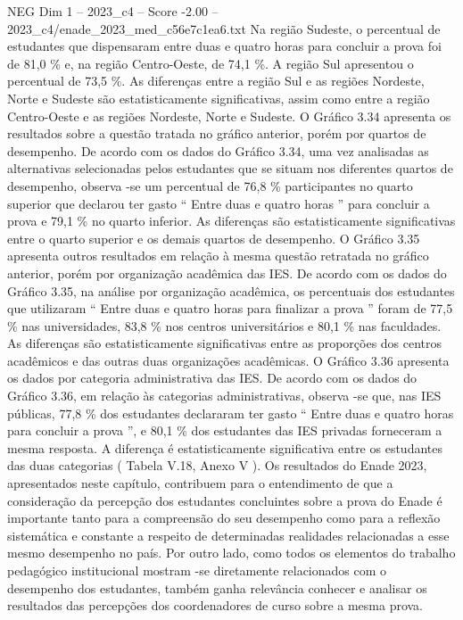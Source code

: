 \begin{textsample}{NEG Dim 1 – 2023\_c4 – Score -2.00 – 2023\_c4/enade\_2023\_med\_c56e7c1ea6.txt}
Na região Sudeste, o percentual de estudantes que dispensaram entre duas e quatro horas para concluir a prova foi de 81,0 \% e, na região Centro-Oeste, de 74,1 \%.
A região Sul apresentou o percentual de 73,5 \%.
As diferenças entre a região Sul e as regiões Nordeste, Norte e Sudeste são estatisticamente significativas, assim como entre a região Centro-Oeste e as regiões Nordeste, Norte e Sudeste.
O Gráfico 3.34 apresenta os resultados sobre a questão tratada no gráfico anterior, porém por quartos de desempenho.
De acordo com os dados do Gráfico 3.34, uma vez analisadas as alternativas selecionadas pelos estudantes que se situam nos diferentes quartos de desempenho, observa -se um percentual de 76,8 \% participantes no quarto superior que declarou ter gasto “ Entre duas e quatro horas ” para concluir a prova e 79,1 \% no quarto inferior.
As diferenças são estatisticamente significativas entre o quarto superior e os demais quartos de desempenho.
O Gráfico 3.35 apresenta outros resultados em relação à mesma questão retratada no gráfico anterior, porém por organização acadêmica das IES.
De acordo com os dados do Gráfico 3.35, na análise por organização acadêmica, os percentuais dos estudantes que utilizaram “ Entre duas e quatro horas para finalizar a prova ” foram de 77,5 \% nas universidades, 83,8 \% nos centros universitários e 80,1 \% nas faculdades.
As diferenças são estatisticamente significativas entre as proporções dos centros acadêmicos e das outras duas organizações acadêmicas.
O Gráfico 3.36 apresenta os dados por categoria administrativa das IES.
De acordo com os dados do Gráfico 3.36, em relação às categorias administrativas, observa -se que, nas IES públicas, 77,8 \% dos estudantes declararam ter gasto “ Entre duas e quatro horas para concluir a prova ”, e 80,1 \% dos estudantes das IES privadas forneceram a mesma resposta.
A diferença é estatisticamente significativa entre os estudantes das duas categorias ( Tabela V.18, Anexo V ).
Os resultados do Enade 2023, apresentados neste capítulo, contribuem para o entendimento de que a consideração da percepção dos estudantes concluintes sobre a prova do Enade é importante tanto para a compreensão do seu desempenho como para a reflexão sistemática e constante a respeito de determinadas realidades relacionadas a esse mesmo desempenho no país.
Por outro lado, como todos os elementos do trabalho pedagógico institucional mostram -se diretamente relacionados com o desempenho dos estudantes, também ganha relevância conhecer e analisar os resultados das percepções dos coordenadores de curso sobre a mesma prova.

\end{textsample}
